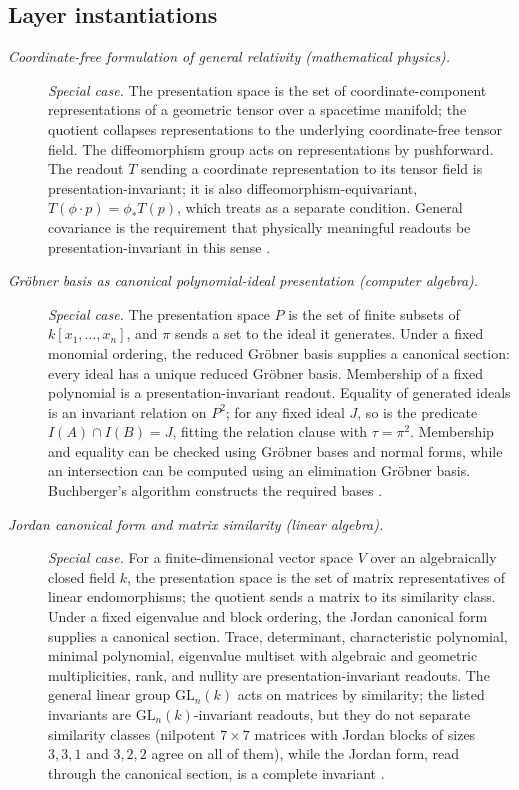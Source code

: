 \subsection*{Layer instantiations}\label{layer-inst:F29}

\begingroup\small
\begin{description}
\item[\emph{Coordinate-free formulation of general
relativity (mathematical physics).}] \textit{Special case.}
The presentation space is the set of
coordinate-component representations of a geometric
tensor over a spacetime manifold; the quotient
collapses representations to the underlying
coordinate-free tensor field.  The diffeomorphism
group acts on representations by pushforward. The
readout \(T\) sending a coordinate representation to its tensor field is
presentation-invariant; it is also diffeomorphism-equivariant,
\(T(\phi\cdot p)=\phi_*T(p)\), which  treats as a separate
condition.  General
covariance is the requirement that physically
meaningful readouts be presentation-invariant in this
sense \citep{MisnerThorneWheeler1973Gravitation}.

\item[\emph{Gr\"obner basis as canonical
polynomial-ideal presentation (computer algebra).}] \textit{Special case.}
The presentation space \(P\) is the set of finite subsets of
\(k[x_1,\dots,x_n]\), and \(\pi\) sends a set to the ideal it generates.
Under a fixed monomial ordering, the reduced Gr\"obner basis supplies a
canonical section: every ideal has a unique reduced Gr\"obner basis.
Membership of a fixed polynomial is a presentation-invariant readout.
Equality of generated ideals is an invariant relation on \(P^2\); for any
fixed ideal \(J\), so is the predicate \(I(A)\cap I(B)=J\), fitting the
relation clause with \(\tau=\pi^2\). Membership and equality can be checked
using Gr\"obner bases and normal forms, while an intersection can be computed
using an elimination Gr\"obner basis. Buchberger's algorithm constructs the
required bases \citep{Buchberger1965ThesisGroebner}.

\item[\emph{Jordan canonical form and matrix similarity
(linear algebra).}] \textit{Special case.}
For a finite-dimensional vector space \(V\) over an
algebraically closed field \(k\), the presentation
space is the set of matrix representatives of linear
endomorphisms; the quotient sends a matrix to its
similarity class.  Under a fixed eigenvalue and
block ordering, the Jordan canonical form supplies a
canonical section.  Trace, determinant, characteristic
polynomial, minimal polynomial, eigenvalue multiset
with algebraic and geometric multiplicities, rank, and
nullity are presentation-invariant readouts.  The
general linear group \(\mathrm{GL}_n(k)\) acts on
matrices by similarity; the listed invariants are
\(\mathrm{GL}_n(k)\)-invariant readouts, but they do not
separate similarity classes (nilpotent \(7\times 7\)
matrices with Jordan blocks of sizes \(3,3,1\) and
\(3,2,2\) agree on all of them), while the Jordan form,
read through the canonical section, is a complete
invariant \citep{HoffmanKunze1971LinearAlgebra}.


\end{description}
